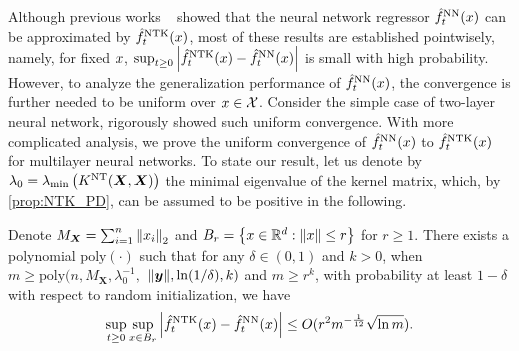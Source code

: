 Although previous works
~\citep{lee2019_WideNeural,arora2019_ExactComputation,allen-zhu2019_ConvergenceTheory}
showed that the neural network regressor $\hat{f}^{\mathrm{NN}}_t(x)$ can be approximated by $\hat{f}^{\mathrm{NTK}}_t(x)$,
most of these results are established pointwisely, namely, for fixed $x$,
$\sup_{t\geq 0}\abs{\hat{f}^{\mathrm{NTK}}_t(x)-\hat{f}^{\mathrm{NN}}_t(x)}$ is small with high probability.
However,
to analyze the generalization performance of $\hat{f}^{\mathrm{NN}}_t(x)$, the convergence is further needed to be uniform over $x \in \mathcal{X}$.
Consider the simple case of two-layer neural network, \citet{lai2023_GeneralizationAbility} rigorously showed such uniform convergence.
With more complicated analysis, we prove the uniform convergence of $\hat{f}^{\mathrm{NN}}_t(x)$ to $\hat{f}^{\mathrm{NTK}}_t(x)$ for multilayer neural networks.
To state our result, let us denote by $\lambda_0 = \lambda_{\min}\left( K^{\mathrm{NT}}(\bm{X},\bm{X}) \right)$ the minimal eigenvalue of the kernel matrix,
which, by \cref{prop:NTK_PD}, can be assumed to be positive in the following.

\begin{lemma}
  \label{lem:UnifConverge}
  Denote $M_{\bm{X}} = \sum_{i=1}^n \norm{x_i}_2$ and $B_r = \left\{x \in \mathbb{R}^d : \norm{x} \leq r\right\}$ for $r \geq 1$.
  There exists a polynomial $\mathrm{poly}(\cdot)$ such that
  for any $\delta \in (0,1)$ and $k > 0$,
  when $m \geq \mathrm{poly}(n,M_{\bm{X}},\lambda_0^{-1},$ $\norm{\bm{y}}, \ln(1/\delta), k)$ and $m \geq r^k$,
  with probability at least $1-\delta$ with respect to random initialization, we have
  \begin{align*}
    \sup_{t\geq 0} \sup_{x \in B_r} \abs{\hat{f}^{\mathrm{NTK}}_t(x) - \hat{f}^{\mathrm{NN}}_t(x)} \leq O(r^2 m^{-\frac{1}{12}} \sqrt {\ln m}).
  \end{align*}
\end{lemma}


